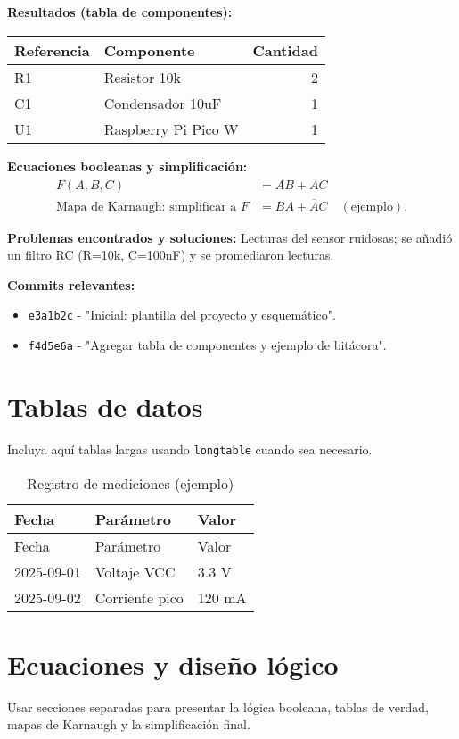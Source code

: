 \documentclass[12pt,a4paper]{article}
\begin{document}
\textbf{Resultados (tabla de componentes):}
\begin{center}
\begin{tabular}{@{}llr@{}}
\toprule
Referencia & Componente & Cantidad \\
\midrule
R1 & Resistor 10k & 2 \\
C1 & Condensador 10uF & 1 \\
U1 & Raspberry Pi Pico W & 1 \\
\bottomrule
\end{tabular}
\end{center}

\textbf{Ecuaciones booleanas y simplificación:}
\begin{align*}
  F(A,B,C) &= A B + \overline{A} C \\ 
  \text{Mapa de Karnaugh: simplificar a } F &= B A + \overline{A}C \quad(\text{ejemplo}).
\end{align*}

\textbf{Problemas encontrados y soluciones:} Lecturas del sensor ruidosas; se añadió un filtro RC (R=10k, C=100nF) y se promediaron lecturas.

\textbf{Commits relevantes:}
\begin{itemize}
  \item \texttt{e3a1b2c} - "Inicial: plantilla del proyecto y esquemático".
  \item \texttt{f4d5e6a} - "Agregar tabla de componentes y ejemplo de bitácora".
\end{itemize}

\newpage
\section{Tablas de datos}
Incluya aquí tablas largas usando \texttt{longtable} cuando sea necesario.

\begin{longtable}{@{}lll@{}}
\caption{Registro de mediciones (ejemplo)}\\
\toprule
Fecha & Parámetro & Valor \\
\midrule
\endfirsthead
\toprule
Fecha & Parámetro & Valor \\
\midrule
\endhead
2025-09-01 & Voltaje VCC & 3.3 V \\
2025-09-02 & Corriente pico & 120 mA \\
\bottomrule
\end{longtable}

\section{Ecuaciones y diseño lógico}
Usar secciones separadas para presentar la lógica booleana, tablas de verdad, mapas de Karnaugh y la simplificación final.
\end{document}
